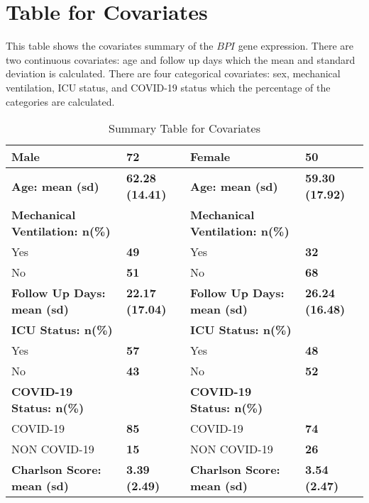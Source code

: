 \documentclass{article}
\begin{document}
\section{Table for Covariates}
\begin{table}[h]
This table {\textbf{\cite{tablecontent}}} shows the covariates summary of the $BPI$ gene expression. There are two continuous covariates: age and follow up days which the mean and standard deviation is calculated. There are four categorical covariates: sex, mechanical ventilation, ICU status, and COVID-19 status which the percentage of the categories are calculated.
\caption{\label{tab:unnamed-chunk-2}Summary Table for Covariates \cite{tablecontent}}
\centering
\begin{tabular}[t]{l|l|l|l}
\hline
{\textbf{Male}} & {\textbf{72}} & {\textbf{Female}} & {\textbf{50}}\\
\hline
\hline
{\textbf{Age: mean (sd)}} & {\textbf{\textbf{62.28 (14.41)}}} & {\textbf{Age: mean (sd)}} & {\textbf{\textbf{59.30 (17.92)}}}\\
\hline
\hline
{\textbf{Mechanical Ventilation: n(\%)}} & {\textbf{\textbf{}}} & {\textbf{Mechanical Ventilation: n(\%)}} & {\textbf{\textbf{}}}\\
\hline
\hline
{\hspace{1em}Yes} & {\textbf{49}} & {\hspace{1em}Yes} & {\textbf{32}}\\
\hline
{\hspace{1em}No} & {\textbf{51}} & {\hspace{1em}No} & {\textbf{68}}\\
\hline
\hline
{\textbf{Follow Up Days: mean (sd)}} & {\textbf{\textbf{22.17 (17.04)}}} & {\textbf{Follow Up Days: mean (sd)}} & {\textbf{\textbf{26.24 (16.48)}}}\\
\hline
\hline
{\textbf{ICU Status: n(\%)}} & {\textbf{\textbf{}}} & {\textbf{ICU Status: n(\%)}} & {\textbf{\textbf{}}}\\
\hline
\hline
{\hspace{1em}Yes} & {\textbf{57}} & {\hspace{1em}Yes} & {\textbf{48}}\\
\hline
{\hspace{1em}No} & {\textbf{43}} & {\hspace{1em}No} & {\textbf{52}}\\
\hline
{\textbf{COVID-19 Status: n(\%)}} & {\textbf{\textbf{}}} & {\textbf{COVID-19 Status: n(\%)}} & {\textbf{\textbf{}}}\\
\hline
\hline
{\hspace{1em}COVID-19} & {\textbf{85}} & {\hspace{1em}COVID-19} & {\textbf{74}}\\
\hline
{\hspace{1em}NON COVID-19} & {\textbf{15}} & {\hspace{1em}NON COVID-19} & {\textbf{26}}\\
\hline
\hline
{\textbf{Charlson Score: mean (sd)}} & {\textbf{\textbf{3.39 (2.49)}}} & {\textbf{Charlson Score: mean (sd)}} & {\textbf{\textbf{3.54 (2.47)}}}\\
\end{tabular}
\cite{bpigene}
\end{table}
\end{document}
